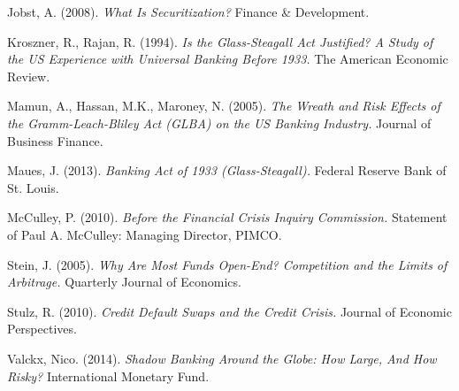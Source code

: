 \documentclass[11pt, english]{article}
\begin{document}
\begin{thebibliography}{9}
		Jobst, A. (2008).
		\textsl{What Is Securitization?}
		Finance \& Development.
                     
		Kroszner, R., Rajan, R. (1994).
		\textsl{Is the Glass-Steagall Act Justified? A Study of the US Experience with Universal Banking Before 1933.}
		The American Economic Review.

		Mamun, A., Hassan, M.K., Maroney, N. (2005).
		\textsl{The Wreath and Risk Effects of the Gramm-Leach-Bliley Act (GLBA) on the US Banking Industry.}
		Journal of Business Finance.
                
		Maues, J. (2013).
		\textsl{Banking Act of 1933 (Glass-Steagall).}
		Federal Reserve Bank of St. Louis.
                     
		McCulley, P. (2010).
		\textsl{Before the Financial Crisis Inquiry Commission.}
		Statement of Paul A. McCulley: Managing Director, PIMCO.

		Stein, J. (2005).
		\textsl{Why Are Most Funds Open-End? Competition and the Limits of Arbitrage.}
		Quarterly Journal of Economics.
                
		Stulz, R. (2010).
		\textsl{Credit Default Swaps and the Credit Crisis.}
		Journal of Economic Perspectives.
                     
		Valckx, Nico. (2014).
		\textsl{Shadow Banking Around the Globe: How Large, And How Risky?}
		International Monetary Fund.

\end{thebibliography}
\end{document}
